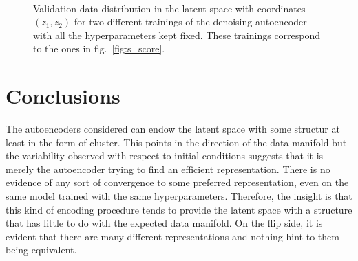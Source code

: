 \documentclass[twocolumn,gsifonts,twoside]{gsipaper}
\begin{document}
  \begin{figure}[htb]
  \\[-2ex]
  \caption{Validation data distribution in the latent space with coordinates $(z_1, z_2)$ for two different trainings of the denoising autoencoder with all the hyperparameters kept fixed. These trainings correspond to the ones in fig.~\ref{fig:s_score}.}
  \label{fig:scatter}
\end{figure}


\section{Conclusions}
The autoencoders considered can endow the latent space with some structur at least in the form of cluster. This points in the direction of the data manifold but the variability observed with respect to initial conditions suggests that it is merely the autoencoder trying to find an efficient representation. There is no evidence of any sort of convergence to some preferred representation, even on the same model trained with the same hyperparameters. Therefore, the insight is that this kind of encoding procedure tends to provide the latent space with a structure that has little to do with the expected data manifold. On the flip side, it is evident that there are many different representations and nothing hint to them being equivalent. 
\end{document}
